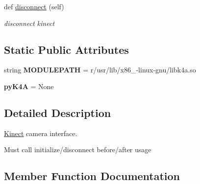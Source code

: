 \begin{DoxyCompactItemize}
\mbox{\label{classrnb-planning_1_1src_1_1pkg_1_1detector_1_1camera_1_1kinect_1_1_kinect_a52c0752ad283edf7e94eb085bbc74fd3}} 
def \hyperlink{classrnb-planning_1_1src_1_1pkg_1_1detector_1_1camera_1_1kinect_1_1_kinect_a52c0752ad283edf7e94eb085bbc74fd3}{disconnect} (self)
\begin{DoxyCompactList}\small\item\em disconnect kinect \end{DoxyCompactList}\end{DoxyCompactItemize}
\subsection*{Static Public Attributes}
\begin{DoxyCompactItemize}
\item 
\mbox{\label{classrnb-planning_1_1src_1_1pkg_1_1detector_1_1camera_1_1kinect_1_1_kinect_a0b24dd673e9fb46a29158f39ee4fe7d0}} 
string {\bfseries M\+O\+D\+U\+L\+E\+P\+A\+TH} = r\textquotesingle{}/usr/lib/x86\+\_-\/linux-\/gnu/libk4a.\+so\textquotesingle{}
\item 
\mbox{\label{classrnb-planning_1_1src_1_1pkg_1_1detector_1_1camera_1_1kinect_1_1_kinect_a5048f6bd7046f0f6e2db7ef596e9393b}} 
{\bfseries py\+K4A} = None
\end{DoxyCompactItemize}


\subsection{Detailed Description}
\hyperlink{classrnb-planning_1_1src_1_1pkg_1_1detector_1_1camera_1_1kinect_1_1_kinect}{Kinect} camera interface. 

Must call initialize/disconnect before/after usage 

\subsection{Member Function Documentation}
\mbox{\label{classrnb-planning_1_1src_1_1pkg_1_1detector_1_1camera_1_1kinect_1_1_kinect_a4901fe8ab2e68f9e8f10e92040cd5332}} 
